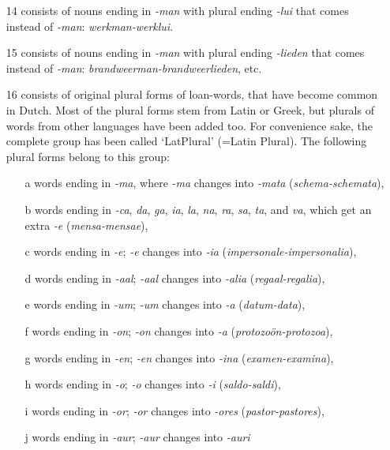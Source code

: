 \begin{itemize}
  \item [14] consists of nouns ending in {\em -man} with plural ending 
             {\em -lui} that comes instead of {\em -man}: {\em werkman-werklui}.

  \item [15] consists of nouns ending in {\em -man} with plural ending 
             {\em -lieden} that comes instead of {\em -man}: 
             {\em brandweerman-brandweerlieden}, etc.

  \item [16] consists of original plural forms of loan-words, that have become 
             common in Dutch. Most of the plural forms stem from Latin or 
             Greek, but plurals of words from other languages have been added
             too. For convenience sake, the complete group has been called 
             `LatPlural' (=Latin Plural). The following plural forms belong to 
             this group:
    \begin{itemize}
      \item [a] words ending in {\em -ma}, where {\em -ma} changes into 
                {\em -mata} ({\em schema-schemata}),
      \item [b] words ending in {\em -ca}, {\em da}, {\em ga}, {\em ia}, 
                {\em la}, {\em na}, {\em ra}, 
                {\em sa}, {\em ta}, and {\em va}, 
                which get an extra {\em -e} ({\em mensa-mensae}),
      \item [c] words ending in {\em -e}; {\em -e} changes into {\em -ia} 
                ({\em impersonale-impersonalia}),
      \item [d] words ending in {\em -aal}; {\em -aal} changes into {\em -alia} 
                ({\em regaal-regalia}),
      \item [e] words ending in {\em -um}; {\em -um} changes into {\em -a} 
                ({\em datum-data}),
      \item [f] words ending in {\em -on}; {\em -on} changes into {\em -a} 
                ({\em protozo\"{o}n-protozoa}),
      \item [g] words ending in {\em -en}; {\em -en} changes into {\em -ina} 
                ({\em examen-examina}),
      \item [h] words ending in {\em -o}; {\em -o} changes into {\em -i} 
                ({\em saldo-saldi}),
      \item [i] words ending in {\em -or}; {\em -or} changes into {\em -ores} 
                ({\em pastor-pastores}),
      \item [j] words ending in {\em -aur}; {\em -aur} changes into {\em -auri} 

\end{itemize}
\end{itemize}
